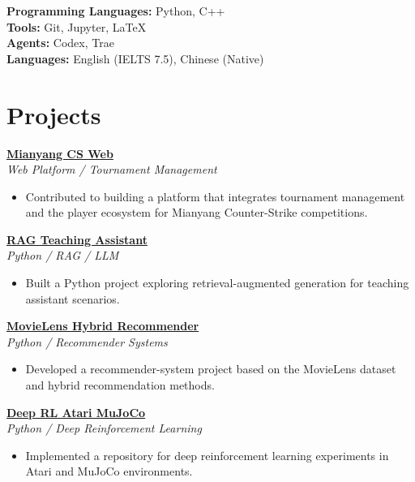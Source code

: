 \documentclass[10pt,a4paper]{article}
\newcommand{\blueitem}[1]{\textcolor{subtitleblue}{\textbf{#1}}}
\begin{document}
\textbf{Programming Languages:} Python, C++ \\
\textbf{Tools:} Git, Jupyter, LaTeX \\
\textbf{Agents:} Codex, Trae \\
\textbf{Languages:} English (IELTS 7.5), Chinese (Native)

\vspace{0.3em}

\section*{Projects}

\href{https://gitee.com/muchuan114514/mymajor-cs-web}{\blueitem{Mianyang CS Web}} \\
\textit{Web Platform / Tournament Management}
\begin{itemize}
    \item Contributed to building a platform that integrates tournament management and the player ecosystem for Mianyang Counter-Strike competitions.
\end{itemize}

\vspace{0.3em}

\href{https://github.com/ThrasHl/rag-teaching-assistant}{\blueitem{RAG Teaching Assistant}} \\
\textit{Python / RAG / LLM}
\begin{itemize}
    \item Built a Python project exploring retrieval-augmented generation for teaching assistant scenarios.
\end{itemize}

\vspace{0.3em}

\href{https://github.com/ThrasHl/movielens-hybrid-recommender}{\blueitem{MovieLens Hybrid Recommender}} \\
\textit{Python / Recommender Systems}
\begin{itemize}
    \item Developed a recommender-system project based on the MovieLens dataset and hybrid recommendation methods.
\end{itemize}

\vspace{0.3em}

\href{https://github.com/ThrasHl/deep-rl-atari-mujoco}{\blueitem{Deep RL Atari MuJoCo}} \\
\textit{Python / Deep Reinforcement Learning}
\begin{itemize}
    \item Implemented a repository for deep reinforcement learning experiments in Atari and MuJoCo environments.
\end{itemize}
\end{document}
